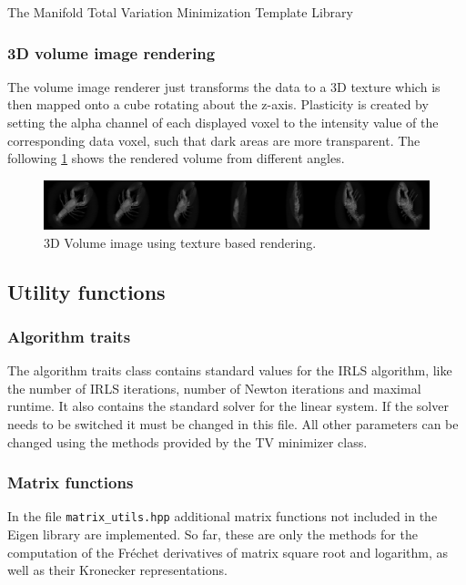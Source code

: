 \begin{chapter}{The Manifold Total Variation Minimization Template Library}
\FloatBarrier
\subsubsection{3D volume image rendering} %
\label{ssub:3D Volume image rendering}
The volume image renderer just transforms the data to a 3D texture which is then mapped onto a cube rotating about the z-axis.
Plasticity is created by setting the alpha channel of each displayed voxel to the intensity value of the corresponding data voxel, such that dark areas are more transparent.
The following \ref{fig:volume_visualization} shows the rendered volume from different angles.
\begin{figure}[h!]
        \centering
	    \includegraphics[width=1.0\linewidth]{./figures/library/3dvol_seq.png}
	    \caption[3D Volume image renderer]{3D Volume image using texture based rendering. }
	\label{fig:volume_visualization}
\end{figure}


\subsection{Utility functions} %
\label{sub:Utility function}

\subsubsection{Algorithm traits} %
\label{ssub:AlgoTraits}
The algorithm traits class contains standard values for the IRLS algorithm, like the number of IRLS iterations, number of Newton iterations and maximal runtime.
It also contains the standard solver for the linear system. If the solver needs to be switched it must be changed in this file. All other parameters can
be changed using the methods provided by the TV minimizer class.


\subsubsection{Matrix functions} %
\label{ssub:Matrix functions}
In the file \texttt{matrix\_utils.hpp} additional matrix functions not included in the Eigen library are implemented.
So far, these are only the methods for the computation of the Fr\'{e}chet derivatives of matrix square root and logarithm, as well as their
Kronecker representations.


\end{chapter}
